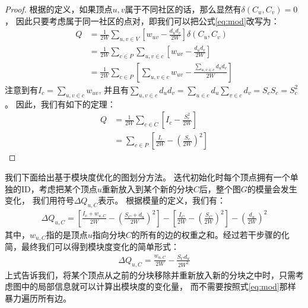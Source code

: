 \documentclass[master]{njuthesis}
\begin{document}
\begin{proof}
根据\label{eq:modularity}的定义，如果顶点$u, v$属于不同社区的话，那么显然有$\delta(C_u, C_v)=0$，
因此只要考虑属于同一社区的点对，即我们可以把公式\ref{eq:mod}改写为：
\begin{equation}
\begin{aligned}
Q &= \frac{1}{2W}\sum\limits_{u, v \in V} \left[w_{uv} - \frac{{d_u}{d_v}}{2W} \right]\delta(C_u, C_v) \\
& = \frac{1}{2W}\sum\limits_{c \in P} {\sum\limits_{u, v \in c} { \left[w_{uv} - \frac{{d_u}{d_v}}{2W} \right]}} \\
& = \frac{1}{2W}\sum\limits_{c \in P} \left[{\sum\limits_{u, v \in c} { w_{uv} - \frac{\sum\nolimits_{u,v \in c}{{d_u}{d_v}}}{2W}}}\right] 
\end{aligned}
\end{equation}
注意到有$I_c=\sum\nolimits_{u, v \in c}  w_{uv}$, 
并且有$\sum\nolimits_{u,v \in c}{{d_u}{d_v}} =
\sum\nolimits_{u \in c}{d_u} \sum\nolimits_{v \in c}{d_v} = S_c S_c = {S^2_c}$。
因此，我们有如下的定理：
\begin{equation}
\begin{aligned}
Q &= \frac{1}{2W}\sum\limits_{c \in C} \left[I_c - \frac{S_c^2}{2W} \right] \\
& = \sum\limits_{c \in P} \left[\frac{I_c}{2W} - {\left(\frac{S_c}{2W}\right)}^2 \right]
\end{aligned}
\end{equation}
\end{proof}

我们下面给出基于模块度优化的图划分方法。
迭代初始化时每个顶点拥有一个单独的ID，考虑把某个顶点$u$重新放入到某个新的分块$C$后，整个图$G$的模量会发生变化，
我们用符号$\Delta Q_{u,C}$表示。
根据模量的定义，我们有：
\begin{equation}
\begin{aligned}
 \Delta Q_{u,C}=\left[ \frac{I_c+w_{u,C}}{2W} - {\left(\frac{S_C + d_u}{2W} \right)}^2 \right] -
 \left[ \frac{I_C}{2W} - {\left(\frac{S_C}{2W} \right)}^2 \right] - {\left(\frac{d_u}{2W}\right)}^2 
\end{aligned}
\end{equation}
其中，$w_{u,C}$指的是顶点$u$指向分块$C$的所有的边的权重之和。经过若干步骤的化简，最终我们可以得到模块度变化的简单形式：
\begin{equation}
\begin{aligned}
\label{eq:deltaQ}
 \Delta Q_{u,C}=\frac{w_{u,C}}{2W} - \frac{S_Cd_u}{2W^2} 
\end{aligned}
\end{equation}
上式告诉我们，将某个顶点从之前的分块移除并重新放入新的分块之中时，只需考虑图中的局部信息就可以计算出模块度的变化量，
而不需要按照式\ref{eq:mod}那样暴力遍历所有边。
\end{document}
